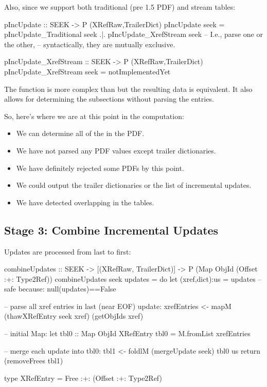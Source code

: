 Also, since we support both traditional (pre 1.5 PDF) and stream
\xref{} tables:

\begin{code}
pIncUpdate :: SEEK -> P (XRefRaw,TrailerDict)
pIncUpdate seek =
      pIncUpdate_Traditional seek
  .|. pIncUpdate_XrefStream seek
      -- I.e., parse one or the other,
      -- syntactically, they are mutually exclusive.

pIncUpdate_XrefStream :: SEEK -> P (XRefRaw,TrailerDict)
pIncUpdate_XrefStream seek = notImplementedYet
\end{code}

The function  is more
complex than  but the resulting
data is equivalent.  It also allows for determining the subsections
without parsing the \xref{} entries.

So, here's where we are at this point in the computation:
\begin{itemize}
\item We can determine all of the \objids{} in the PDF.
\item We have not parsed any PDF values except trailer dictionaries.
\item We have definitely rejected some PDFs by this point.
\item We could output the trailer dictionaries or the list of
  incremental updates.
\item We have detected overlapping \objids{} in the \xref{} tables.
\end{itemize}


\subsection{Stage 3: Combine Incremental Updates}
%
Updates are processed from last to first:
\begin{code}
combineUpdates :: SEEK
               -> [(XRefRaw, TrailerDict)] 
               -> P (Map ObjId (Offset :+: Type2Ref))
combineUpdates seek updates =
    do
    let (xref,dict):us = updates -- safe because: null(updates)==False

    -- parse all xref entries in last (near EOF) update:
    xrefEntries <- mapM (thawXRefEntry seek xref) (getObjIds xref)

    -- initial Map:
    let tbl0 :: Map ObjId XRefEntry
        tbl0 = M.fromList xrefEntries

    -- merge each update into tbl0:
    tbl1  <- foldlM (mergeUpdate seek) tbl0 us
    return (removeFrees tbl1)

type XRefEntry = Free :+: (Offset :+: Type2Ref)
\end{code}

